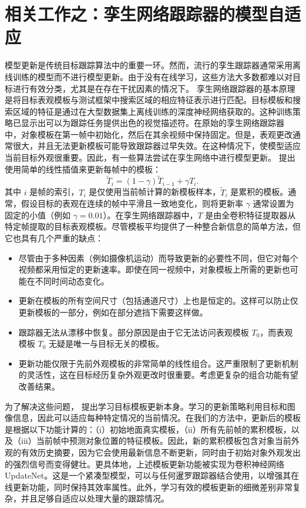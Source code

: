 \section{相关工作之：孪生网络跟踪器的模型自适应}
模型更新是传统目标跟踪算法中的重要一环。然而，流行的孪生跟踪器通常采用离线训练的模型而不进行模型更新。由于没有在线学习，这些方法大多数都难以对目标进行有效分类，尤其是在存在干扰因素的情况下。
孪生网络跟踪器的基本原理是将目标表观模板与测试框架中搜索区域的相应特征表示进行匹配。目标模板和搜索区域的特征是通过在大型数据集上离线训练的深度神经网络获取的。这种训练策略已显示出可以为跟踪任务提供出色的视觉描述符。在原始的孪生网络跟踪器 \cite{SiamFC} 中，对象模板在第一帧中初始化，然后在其余视频中保持固定。但是，表观更改通常很大，并且无法更新模板可能导致跟踪器过早失效。在这种情况下，使模型适应当前目标外观很重要。因此，有一些算法尝试在孪生网络中进行模型更新。\cite{DaSiamRPN} 提出使用简单的线性插值来更新每帧中的模板：
\begin{equation}
\widetilde{T}_{i}=(1-\gamma) \widetilde{T}_{i-1}+\gamma T_{i}.
\end{equation}
其中 $i$ 是帧的索引，$T_{i}$ 是仅使用当前帧计算的新模板样本，$\widetilde{T}_{i}$ 是累积的模板。通常，假设目标的表观在连续的帧中平滑且一致地变化，则将更新率 $\gamma$ 通常设置为固定的小值（例如 $\gamma = 0.01$）。在孪生网络跟踪器中，$T$ 是由全卷积特征提取器从特定帧提取的目标表观模板。尽管模板平均提供了一种整合新信息的简单方法，但它也具有几个严重的缺点：
\begin{itemize}
\item 尽管由于多种因素（例如摄像机运动）而导致更新的必要性不同，但它对每个视频都采用恒定的更新速率。即使在同一视频中，对象模板上所需的更新也可能在不同时间动态变化。
\item 更新在模板的所有空间尺寸（包括通道尺寸）上也是恒定的。这样可以防止仅更新模板的一部分，例如在部分遮挡下需要这样做。
\item 跟踪器无法从漂移中恢复。部分原因是由于它无法访问表观模板 $T_{0}$，而表观模板 $T_{0}$ 无疑是唯一与目标无关的模板。
\item 更新功能仅限于先前外观模板的非常简单的线性组合。这严重限制了更新机制的灵活性，这在目标经历复杂外观更改时很重要。考虑更复杂的组合功能有望改善结果。
\end{itemize}
为了解决这些问题，\cite{UpdateNet} 提出学习目标模板更新本身。学习的更新策略利用目标和图像信息，因此可以适应每种特定情况的当前情况。在我们的方法中，更新后的模板是根据以下功能计算的：（i）初始地面真实模板，（ii）所有先前帧的累积模板，以及（iii）当前帧中预测对象位置的特征模板。因此，新的累积模板包含对象当前外观的有效历史摘要，因为它会使用最新信息不断更新，同时由于初始对象外观发出的强烈信号而变得健壮。更具体地，上述模板更新功能被实现为卷积神经网络UpdateNet。这是一个紧凑型模型，可以与任何暹罗跟踪器结合使用，以增强其在线更新功能，同时保持其效率属性。此外，学习有效的模板更新的细微差别非常复杂，并且足够自适应以处理大量的跟踪情况。
